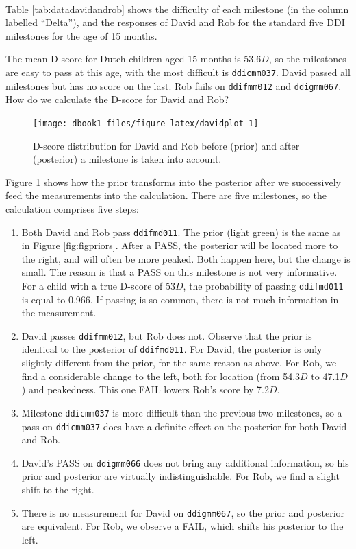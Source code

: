 \documentclass[
]{book}
\begin{document}
~

Table \ref{tab:datadavidandrob} shows the difficulty of each milestone (in the column labelled ``Delta''), and the responses of David and Rob for the standard five DDI milestones for the age of 15 months.

The mean D-score for Dutch children aged 15 months is 53.6\(D\), so the milestones are easy to pass at this age, with the most difficult is \texttt{ddicmm037}. David passed all milestones but has no score on the last. Rob fails on \texttt{ddifmm012} and \texttt{ddigmm067}. How do we calculate the D-score for David and Rob?

\begin{figure}

{\centering \texttt{[image: dbook1\_files/figure-latex/davidplot-1]} 

}

\caption{D-score distribution for David and Rob before (prior) and after (posterior) a milestone is taken into account.}\label{fig:davidplot}
\end{figure}



Figure \ref{fig:davidplot} shows how the prior transforms into the posterior after we successively feed the measurements into the calculation. There are five milestones, so the calculation comprises five steps:

\begin{enumerate}
\def\labelenumi{\arabic{enumi}.}
\item
  Both David and Rob pass \texttt{ddifmd011}. The prior (light green) is the same as in Figure \ref{fig:figpriors}. After a PASS, the posterior will be located more to the right, and will often be more peaked. Both happen here, but the change is small. The reason is that a PASS on this milestone is not very informative. For a child with a true D-score of 53\(D\), the probability of passing \texttt{ddifmd011} is equal to 0.966. If passing is so common, there is not much information in the measurement.
\item
  David passes \texttt{ddifmm012}, but Rob does not. Observe that the prior is identical to the posterior of \texttt{ddifmd011}. For David, the posterior is only slightly different from the prior, for the same reason as above. For Rob, we find a considerable change to the left, both for location (from 54.3\(D\) to 47.1\(D\)) and peakedness. This one FAIL lowers Rob's score by 7.2\(D\).
\item
  Milestone \texttt{ddicmm037} is more difficult than the previous two milestones, so a pass on \texttt{ddicmm037} does have a definite effect on the posterior for both David and Rob.
\item
  David's PASS on \texttt{ddigmm066} does not bring any additional information, so his prior and posterior are virtually indistinguishable. For Rob, we find a slight shift to the right.
\item
  There is no measurement for David on \texttt{ddigmm067}, so the prior and posterior are equivalent. For Rob, we observe a FAIL, which shifts his posterior to the left.
\end{enumerate}
\end{document}
